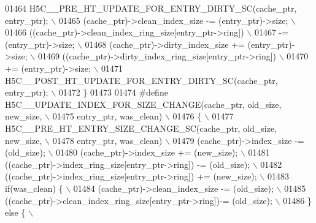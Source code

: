 \begin{DoxyCode}
01464 \textcolor{preprocessor}{    H5C\_\_PRE\_HT\_UPDATE\_FOR\_ENTRY\_DIRTY\_SC(cache\_ptr, entry\_ptr);  \(\backslash\)}
01465 \textcolor{preprocessor}{    (cache\_ptr)->clean\_index\_size -= (entry\_ptr)->size;           \(\backslash\)}
01466 \textcolor{preprocessor}{    ((cache\_ptr)->clean\_index\_ring\_size[entry\_ptr->ring])         \(\backslash\)}
01467 \textcolor{preprocessor}{        -= (entry\_ptr)->size;                             \(\backslash\)}
01468 \textcolor{preprocessor}{    (cache\_ptr)->dirty\_index\_size += (entry\_ptr)->size;           \(\backslash\)}
01469 \textcolor{preprocessor}{    ((cache\_ptr)->dirty\_index\_ring\_size[entry\_ptr->ring])         \(\backslash\)}
01470 \textcolor{preprocessor}{        += (entry\_ptr)->size;                             \(\backslash\)}
01471 \textcolor{preprocessor}{    H5C\_\_POST\_HT\_UPDATE\_FOR\_ENTRY\_DIRTY\_SC(cache\_ptr, entry\_ptr); \(\backslash\)}
01472 \textcolor{preprocessor}{\}}
01473 
01474 \textcolor{preprocessor}{#define H5C\_\_UPDATE\_INDEX\_FOR\_SIZE\_CHANGE(cache\_ptr, old\_size, new\_size,    \(\backslash\)}
01475 \textcolor{preprocessor}{                                  entry\_ptr, was\_clean)             \(\backslash\)}
01476 \textcolor{preprocessor}{\{                                                                           \(\backslash\)}
01477 \textcolor{preprocessor}{    H5C\_\_PRE\_HT\_ENTRY\_SIZE\_CHANGE\_SC(cache\_ptr, old\_size, new\_size,         \(\backslash\)}
01478 \textcolor{preprocessor}{                             entry\_ptr, was\_clean)                  \(\backslash\)}
01479 \textcolor{preprocessor}{    (cache\_ptr)->index\_size -= (old\_size);                                  \(\backslash\)}
01480 \textcolor{preprocessor}{    (cache\_ptr)->index\_size += (new\_size);                                  \(\backslash\)}
01481 \textcolor{preprocessor}{    ((cache\_ptr)->index\_ring\_size[entry\_ptr->ring]) -= (old\_size);          \(\backslash\)}
01482 \textcolor{preprocessor}{    ((cache\_ptr)->index\_ring\_size[entry\_ptr->ring]) += (new\_size);          \(\backslash\)}
01483 \textcolor{preprocessor}{    if(was\_clean) \{                                                         \(\backslash\)}
01484 \textcolor{preprocessor}{        (cache\_ptr)->clean\_index\_size -= (old\_size);                        \(\backslash\)}
01485 \textcolor{preprocessor}{        ((cache\_ptr)->clean\_index\_ring\_size[entry\_ptr->ring])-= (old\_size); \(\backslash\)}
01486 \textcolor{preprocessor}{    \} else \{                                                                \(\backslash\)}

\end{DoxyCode}
